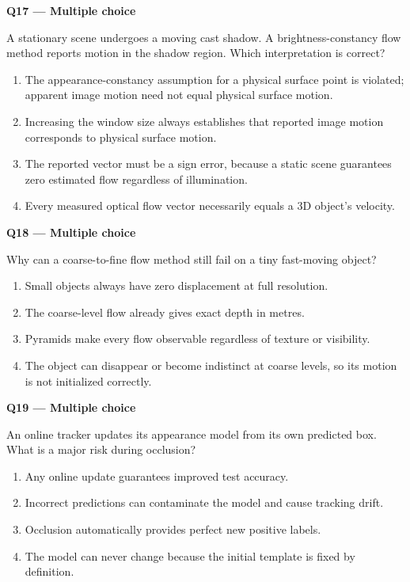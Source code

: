 \documentclass[11pt,a4paper]{article}
\begin{document}
\begin{minipage}{\linewidth}
\textbf{Q17 — Multiple choice}\par\smallskip
A stationary scene undergoes a moving cast shadow. A brightness-constancy flow method reports motion in the shadow region. Which interpretation is correct?
\begin{enumerate}[label=\textbf{\Alph*.}]
\item The appearance-constancy assumption for a physical surface point is violated; apparent image motion need not equal physical surface motion.
\item Increasing the window size always establishes that reported image motion corresponds to physical surface motion.
\item The reported vector must be a sign error,\allowbreak{} because a static scene guarantees zero estimated flow regardless of illumination.
\item Every measured optical flow vector necessarily equals a 3D object's velocity.
\end{enumerate}
\end{minipage}
\par\vspace{12pt}
\begin{minipage}{\linewidth}
\textbf{Q18 — Multiple choice}\par\smallskip
Why can a coarse-to-fine flow method still fail on a tiny fast-moving object?
\begin{enumerate}[label=\textbf{\Alph*.}]
\item Small objects always have zero displacement at full resolution.
\item The coarse-level flow already gives exact depth in metres.
\item Pyramids make every flow observable regardless of texture or visibility.
\item The object can disappear or become indistinct at coarse levels,\allowbreak{} so its motion is not initialized correctly.
\end{enumerate}
\end{minipage}
\par\vspace{12pt}
\begin{minipage}{\linewidth}
\textbf{Q19 — Multiple choice}\par\smallskip
An online tracker updates its appearance model from its own predicted box. What is a major risk during occlusion?
\begin{enumerate}[label=\textbf{\Alph*.}]
\item Any online update guarantees improved test accuracy.
\item Incorrect predictions can contaminate the model and cause tracking drift.
\item Occlusion automatically provides perfect new positive labels.
\item The model can never change because the initial template is fixed by definition.
\end{enumerate}
\end{minipage}
\end{document}

